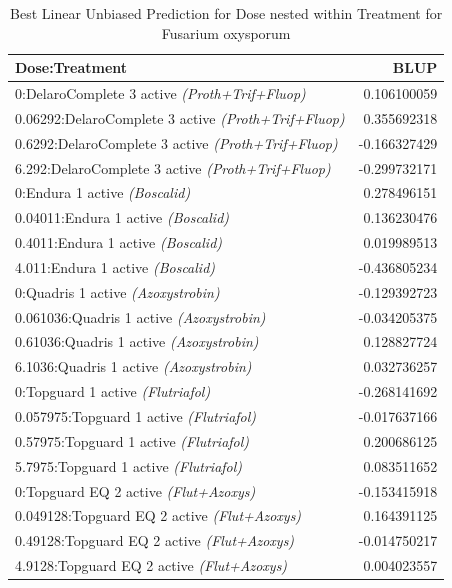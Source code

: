 \documentclass[
  10pt,
  letterpaper,
  twocolumn]{article}
\begin{document}
\begin{table}[ht]
\centering
\small
\caption{Best Linear Unbiased Prediction for Dose nested within Treatment for Fusarium oxysporum }
\renewcommand{\arraystretch}{1.2}
\begin{tabular}{|p{6.4cm}|r|}
\hline
\textbf{Dose:Treatment} & \textbf{BLUP} \\
\hline
0:DelaroComplete 3 active \textit{(Proth+Trif+Fluop)} & 0.106100059 \\
0.06292:DelaroComplete 3 active \textit{(Proth+Trif+Fluop)} & 0.355692318\\
0.6292:DelaroComplete 3 active \textit{(Proth+Trif+Fluop)} & -0.166327429 \\
6.292:DelaroComplete 3 active \textit{(Proth+Trif+Fluop)} & -0.299732171 \\
0:Endura 1 active \textit{(Boscalid)} & 0.278496151 \\
0.04011:Endura 1 active \textit{(Boscalid)} & 0.136230476 \\
0.4011:Endura 1 active \textit{(Boscalid)} & 0.019989513 \\
4.011:Endura 1 active \textit{(Boscalid)} & -0.436805234 \\
0:Quadris 1 active \textit{(Azoxystrobin)} & -0.129392723 \\
0.061036:Quadris 1 active \textit{(Azoxystrobin)} & -0.034205375 \\
0.61036:Quadris 1 active \textit{(Azoxystrobin)} & 0.128827724 \\
6.1036:Quadris 1 active \textit{(Azoxystrobin)} & 0.032736257 \\
0:Topguard 1 active \textit{(Flutriafol)} & -0.268141692 \\
0.057975:Topguard 1 active \textit{(Flutriafol)} & -0.017637166 \\
0.57975:Topguard 1 active \textit{(Flutriafol)} & 0.200686125 \\
5.7975:Topguard 1 active \textit{(Flutriafol)} & 0.083511652 \\
0:Topguard EQ 2 active \textit{(Flut+Azoxys)} & -0.153415918 \\
0.049128:Topguard EQ 2 active \textit{(Flut+Azoxys)} & 0.164391125 \\
0.49128:Topguard EQ 2 active \textit{(Flut+Azoxys)} & -0.014750217 \\
4.9128:Topguard EQ 2 active \textit{(Flut+Azoxys)} & 0.004023557 \\
\hline
\end{tabular}
\end{table}
\end{document}
